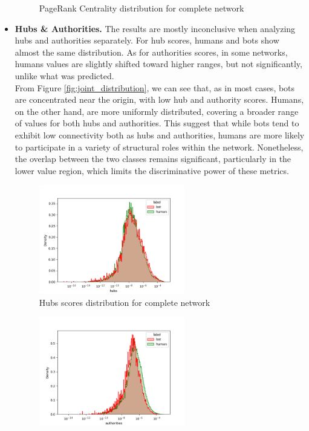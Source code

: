 \documentclass[12pt, a4paper]{article}
\begin{document}
\begin{itemize}
\begin{figure}[H]
                    \caption{PageRank Centrality distribution for complete network}
                \end{figure}
            \item \textbf{Hubs \& Authorities.} The results are mostly inconclusive when analyzing hubs and authorities separately. For hub scores, humans and bots show almost the same distribution. As for authorities scores, in some networks, humans values are slightly shifted toward higher ranges, but not significantly, unlike what was predicted.\\
            	From Figure \ref{fig:joint_distribution}, we can see that, as in most cases, bots are concentrated near the origin, with low hub and authority scores. Humans, on the other hand, are more uniformly distributed, covering a broader range of values for both hubs and authorities. This suggest that while bots tend to exhibit low connectivity both as hubs and authorities, humans are more likely to participate in a variety of structural roles within the network. Nonetheless, the overlap between the two classes remains significant, particularly in the lower value region, which limits the discriminative power of these metrics.
                \begin{figure}[H]
                    \centering
                    \includegraphics[width=0.6\textwidth]{results/complete_hubs.png}
                    \caption{Hubs scores distribution for complete network}
                \end{figure}
                \begin{figure}[H]
                    \centering
                    \includegraphics[width=0.6\textwidth]{results/complete_authorities.png}

\end{figure}
\end{itemize}
\end{document}

